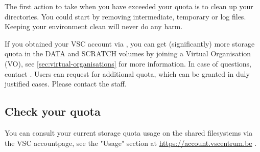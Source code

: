 \begin{tip}
The first action to take when you have exceeded your quota is
to clean up your directories. You could start by removing intermediate,
temporary or log files.  Keeping your environment clean will never do any harm.
\end{tip}

\begin{tip}
\ifleuven\else\ifantwerpen\else %
If you obtained your VSC account via \university, you can get
(significantly) more storage quota in the DATA and SCRATCH volumes
by joining a Virtual Organisation (VO),
see \autoref{sec:virtual-organisations} for more information.
In case of questions, contact \hpcinfo.
\fi\fi
\ifgent\else\ifbrussel\else %
Users can request for additional quota, which can be granted in
duly justified cases. Please contact the \hpcTeam staff.
\fi\fi
\end{tip}

\subsection{Check your quota}




\ifgent
You can consult your current storage quota usage
on the \hpcInfra shared filesystems via the VSC accountpage,
see the "Usage" section at \url{https://account.vscentrum.be} .

